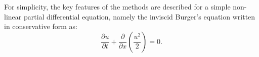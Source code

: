 For simplicity, the key features of the methods are described for
a simple non-linear partial differential equation, namely
the inviscid Burger's equation written in conservative form as:
\begin{equation}
  \frac{\partial u}{\partial t} + 
  \frac{\partial}{\partial x} \left( \frac{u^2}{2} \right) = 
  0.
  \label{eq:sm_nonlinear_convection_conservative}
\end{equation}
